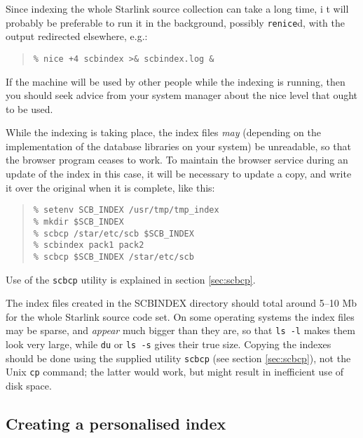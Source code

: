 \documentclass[twoside,11pt]{article}
\newcommand{\xlabel}[1]{}
\renewcommand{\_}{\texttt{\symbol{95}}}
\begin{document}
Since indexing the whole Starlink source collection can take a long time, i
t will probably be preferable to 
run it in the background, possibly {\tt renice}d, with the output
redirected elsewhere, e.g.:
\begin{quote}
\begin{verbatim}
% nice +4 scbindex >& scbindex.log &
\end{verbatim}
\end{quote}
If the machine will be used by other people while the indexing 
is running, then you should seek advice from your system manager 
about the nice level that ought to be used.

While the indexing is taking place, the index files {\it may\/} 
(depending on the implementation of the database libraries on
your system)
be unreadable, so that the browser program ceases to work.
To maintain the browser service during an update of the index in this
case, it will be necessary to update a copy, and write it over the
original when it is complete, like this:
\begin{quote}
\begin{verbatim}
% setenv SCB_INDEX /usr/tmp/tmp_index
% mkdir $SCB_INDEX
% scbcp /star/etc/scb $SCB_INDEX
% scbindex pack1 pack2
% scbcp $SCB_INDEX /star/etc/scb
\end{verbatim}
\end{quote}
Use of the {\tt scbcp} utility is explained in 
section \ref{sec:scbcp}.

The index files created in the SCB\_INDEX directory should 
total around 5--10 Mb for the whole Starlink source code set.  
On some operating systems the index files may be 
sparse, and {\em appear} much bigger than they are,
so that {\tt ls~-l} makes them look very large, 
while {\tt du} or {\tt ls~-s} gives their true size.
Copying the indexes should be done using the supplied utility
{\tt scbcp} (see section \ref{sec:scbcp}), 
not the Unix {\tt cp} command; the latter would
work, but might result in inefficient use of disk space.


\subsection{\xlabel{sec:personalise}\label{sec:personalise}Creating a personalised index}
\end{document}
